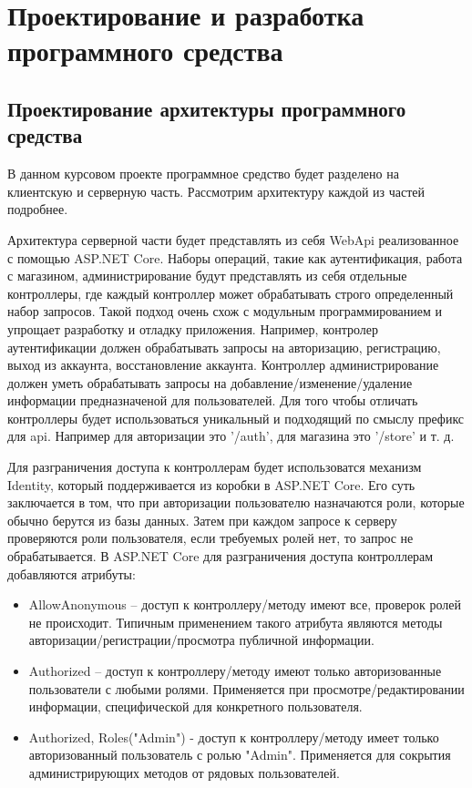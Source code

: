 \section{Проектирование и разработка программного средства} 
\label{sec:development}

\subsection{Проектирование архитектуры программного средства} 
\label{sec:development:arch}

В данном курсовом проекте программное средство будет разделено на клиентскую и серверную часть. Рассмотрим архитектуру каждой из частей подробнее.

Архитектура серверной части будет представлять из себя WebApi реализованное с помощью ASP.NET Core. Наборы операций, такие как аутентификация, работа с магазином, администрирование будут представлять из себя отдельные контроллеры, где каждый контроллер может обрабатывать строго определенный набор запросов.
Такой подход очень схож с модульным программированием и упрощает разработку и отладку приложения. Например, контролер аутентификации должен обрабатывать запросы на авторизацию, регистрацию, выход из аккаунта, восстановление аккаунта.
Контроллер администрирование должен уметь обрабатывать запросы на добавление/изменение/удаление информации предназначеной для пользователей. Для того чтобы отличать контроллеры будет использоваться уникальный и подходящий по смыслу префикс для api.
Например для авторизации это '/auth', для магазина это '/store' и т. д. 

Для разграничения доступа к контроллерам будет использоватся механизм Identity, который поддерживается из коробки в ASP.NET Core. Его суть заключается в том, что при авторизации пользователю назначаются роли, 
которые обычно берутся из базы данных. Затем при каждом запросе к серверу проверяются роли пользователя, если требуемых ролей нет, то запрос не обрабатывается. 
В ASP.NET Core для разграничения доступа контроллерам добавляются атрибуты: 
\begin{itemize}
	\item AllowAnonymous -- доступ к контроллеру/методу имеют все, проверок ролей не происходит. Типичным применением такого атрибута являются методы авторизации/регистрации/просмотра публичной информации.
	\item Authorized -- доступ к контроллеру/методу имеют только авторизованные пользователи с любыми ролями. Применяется при просмотре/редактировании информации, специфической для конкретного пользователя.
	\item Authorized, Roles("Admin") - доступ к контроллеру/методу имеет только авторизованный пользователь с ролью "Admin". Применяется для сокрытия администрирующих методов от рядовых пользователей. 
\end{itemize} 

